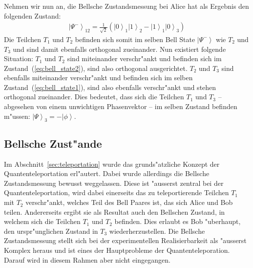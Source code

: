 \begin{refsection}
Nehmen wir nun an, die Bellsche Zustandsmessung bei Alice hat als Ergebnis den folgenden Zustand:
\begin{align}\label{eq:bell_state2}
\left|\Psi^{-}\right\rangle_{12} = \frac{1}{\sqrt{2}} ( \left|0\right\rangle_{1}\left|1\right\rangle_{2} - \left|1\right\rangle_{1}\left|0\right\rangle_{3} )
\end{align}
Die Teilchen $T_{1}$ und $T_{2}$ befinden sich somit im selben Bell State $\left| \Psi^{-} \right \rangle$ wie $T_{2}$ und $T_{3}$ und sind damit ebenfalls orthogonal zueinander. Nun existiert folgende Situation: $T_{1}$ und $T_{2}$ sind miteinander verschr"ankt und befinden sich im Zustand~(\ref{eq:bell_state2}), sind also orthogonal ausgerichtet. $T_{2}$ und $T_{3}$ sind ebenfalls miteinander verschr"ankt und befinden sich im selben Zustand~(\ref{eq:bell_state1}), sind also ebenfalls verschr"ankt und stehen orthogonal zueinander. Dies bedeutet, dass sich die Teilchen $T_{1}$ und $T_{3}$ -- abgesehen von einem unwichtigen Phasenvektor -- im selben Zustand befinden m"ussen: $\left| \Psi\right\rangle_{3} = -\left|\phi\right\rangle$.

\subsection{Bellsche Zust"ande}\label{sec:bell-states}

Im Abschnitt~\ref{sec:teleportation} wurde das grunds"atzliche Konzept der Quantenteleportation erl"autert. Dabei wurde allerdings die Bellsche Zustandsmessung bewusst weggelassen. Diese ist "ausserst zentral bei der Quantenteleportation, wird dabei einerseits das zu teleportierende Teilchen $T_{1}$ mit $T_{2}$ verschr"ankt, welches Teil des Bell Paares ist, das sich Alice und Bob teilen. Andererseits ergibt sie als Resultat auch den Bellschen Zustand, in welchem sich die Teilchen $T_{1}$ und $T_{2}$ befinden. Dies erlaubt es Bob "uberhaupt, den urspr"unglichen Zustand in $T_{3}$ wiederherzustellen. Die Bellsche Zustandsmessung stellt sich bei der experimentellen Realisierbarkeit als "ausserst Komplex heraus und ist eines der Hauptprobleme der Quantenteleporation. Darauf wird in diesem Rahmen aber nicht eingegangen.


\end{refsection}

